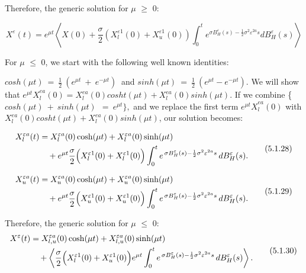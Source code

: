 \documentclass[12pt,a4paper]{report}
\numberwithin{equation}{section}
\begin{document}
Therefore, the generic solution for $\mu$ $\geq$ 0:

\[X^{\varepsilon}(t) = e^{\mu t}\left\langle X(0) + \frac{\sigma}{2}\left( X_{l}^{\varepsilon 1}(0) + X_{u}^{\varepsilon 1}(0) \right)\int_{0}^{t}{e^{\sigma B_{H}^{\varepsilon}(s) - \frac{1}{2}\sigma^{2}\varepsilon^{2a}s}dB_{H}^{\varepsilon}(s)} \right\rangle\]

For $\mu$ $\leq$ 0, we start with the following well known identities:

\(cosh(\mu t)\  = \ \frac{1}{2}\ (e^{\mu t}\  + \ e^{-\mu t})\ \) and
\(sinh(\mu t)\  = \ \frac{1}{2}\ (e^{\mu t} - e^{-\mu t}).\) We will show that
\({e^{\mu t}X}_{l}^{ea}(0) = X_{l}^{ea}(0)cosht(\mu t) + X_{l}^{ea}(0)sinh(\mu t)\).
If we combine \{\(cosh(\mu t)\  + \ sinh(\mu t)\ \  = \ e^{\mu t}\},\)
and we replace the first term \({e^{\mu t}X}_{l}^{ea}(0)\) with
\(X_{l}^{ea}(0)cosht(\mu t) + X_{l}^{ea}(0)sinh(\mu t)\), our solution
becomes:

\[
\begin{aligned}
X_{l}^{\varepsilon a}(t)
&= X_{l}^{\varepsilon a}(0)\cosh(\mu t)
+ X_{l}^{\varepsilon a}(0)\sinh(\mu t) \\
&\quad + e^{\mu t}\frac{\sigma}{2}\Bigl(X_{l}^{\varepsilon 1}(0)+X_{l}^{\varepsilon 1}(0)\Bigr)
\int_{0}^{t} e^{\,\sigma B_{H}^{\varepsilon}(s)-\frac{1}{2}\sigma^{2}\varepsilon^{2a}s}\,dB_{H}^{\varepsilon}(s).
\end{aligned}
\tag{5.1.28}
\]

\[
\begin{aligned}
X_{u}^{\varepsilon a}(t)
&= X_{u}^{\varepsilon a}(0)\cosh(\mu t)
+ X_{u}^{\varepsilon a}(0)\sinh(\mu t) \\
&\quad + e^{\mu t}\frac{\sigma}{2}\Bigl(X_{u}^{\varepsilon 1}(0)+X_{u}^{\varepsilon 1}(0)\Bigr)
\int_{0}^{t} e^{\,\sigma B_{H}^{\varepsilon}(s)-\frac{1}{2}\sigma^{2}\varepsilon^{2a}s}\,dB_{H}^{\varepsilon}(s).
\end{aligned}
\tag{5.1.29}
\]


Therefore, the generic solution for $\mu$ $\leq$ 0:
\[
\begin{aligned}
X^{\varepsilon}(t)
&= X_{l,u}^{\varepsilon a}(0)\cosh(\mu t)
+ X_{l,u}^{\varepsilon a}(0)\sinh(\mu t) \\
&\quad + \left\langle
\frac{\sigma}{2}\Bigl(X_{l}^{\varepsilon 1}(0)+X_{u}^{\varepsilon 1}(0)\Bigr)e^{\mu t}
\int_{0}^{t} e^{\,\sigma B_{H}^{\varepsilon}(s)-\frac{1}{2}\sigma^{2}\varepsilon^{2a}s}\,dB_{H}^{\varepsilon}(s)
\right\rangle .
\end{aligned}
\tag{5.1.30}
\]
\end{document}
